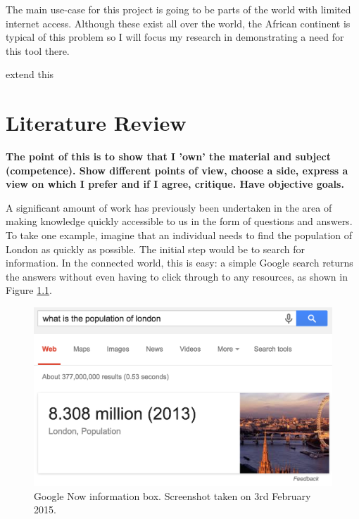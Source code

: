 \documentclass[authoryearcitations]{UoYCSproject}
\begin{document}
The main use-case for this project is going to be parts of the world with limited internet access.  Although these exist all over the world, the African continent is typical of this problem so I will focus my research in demonstrating a need for this tool there.

{\color{red} extend this}

\newpage

\chapter{Literature Review}
\label{sec:literatureReview}

{\bf The point of this is to show that I 'own' the material and subject (competence).  Show different points of view, choose a side, express a view on which I prefer and if I agree, critique.  Have objective goals.}

A significant amount of work has previously been undertaken in the area of making knowledge quickly accessible to us in the form of questions and answers.  To take one example, imagine that an individual needs to find the population of London as quickly as possible.  The initial step would be to search for information.  In the connected world, this is easy: a simple Google search returns the answers without even having to click through to any resources, as shown in Figure \ref{fig:googleInstant}.

\begin{figure}[htb] 
\includegraphics[width=\linewidth]{googleInstant}
\caption{Google Now information box.  Screenshot taken on 3rd February 2015.}
\label{fig:googleInstant}
\end{figure}
\end{document}
